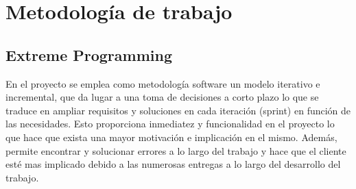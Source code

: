 \chapter{Metodología de trabajo}
\label{cap:Metodologia}
\section{Extreme Programming}
En el proyecto se emplea como metodología software un modelo iterativo e incremental,
que da lugar a una toma de decisiones a corto plazo lo que se traduce en ampliar requisitos y
soluciones en cada iteración (sprint) en función de las necesidades. Esto proporciona inmediatez
y funcionalidad en el proyecto lo que hace que exista una mayor motivación e implicación en
el mismo. Además, permite encontrar y solucionar errores a lo largo del trabajo y hace que el
cliente esté mas implicado debido a las numerosas entregas a lo largo del desarrollo del trabajo.

